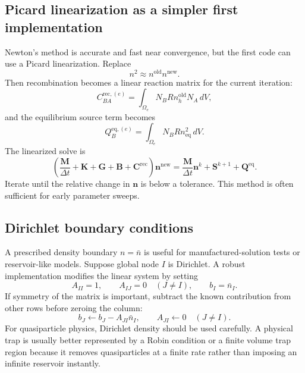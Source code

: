 \documentclass[11pt]{article}
\newcommand{\rec}{\mathrm{rec}}
\newcommand{\eq}{\mathrm{eq}}
\begin{document}
\subsection{Picard linearization as a simpler first implementation}
Newton's method is accurate and fast near convergence, but the first code can use a Picard linearization. Replace
\begin{equation}
n^2\approx n^{\mathrm{old}}n^{\mathrm{new}}.
\end{equation}
Then recombination becomes a linear reaction matrix for the current iteration:
\begin{equation}
C_{BA}^{\rec,(e)}=\int_{\Omega_e}N_B R n_h^{\mathrm{old}}N_A\,dV,
\end{equation}
and the equilibrium source term becomes
\begin{equation}
Q_B^{\eq,(e)}=\int_{\Omega_e}N_B R n_{\eq}^2\,dV.
\end{equation}
The linearized solve is
\begin{equation}
\left(\frac{\bm{M}}{\Delta t}+\bm{K}+\bm{G}+\bm{B}+\bm{C}^{\rec}\right)\bm{n}^{\mathrm{new}}
=\frac{\bm{M}}{\Delta t}\bm{n}^{k}+\bm{S}^{k+1}+\bm{Q}^{\eq}.
\end{equation}
Iterate until the relative change in $\bm{n}$ is below a tolerance. This method is often sufficient for early parameter sweeps.

\subsection{Dirichlet boundary conditions}
A prescribed density boundary $n=\bar n$ is useful for manufactured-solution tests or reservoir-like models. Suppose global node $I$ is Dirichlet. A robust implementation modifies the linear system by setting
\begin{equation}
A_{II}=1,
\qquad A_{IJ}=0\quad(J\ne I),
\qquad b_I=\bar n_I.
\end{equation}
If symmetry of the matrix is important, subtract the known contribution from other rows before zeroing the column:
\begin{equation}
b_J\leftarrow b_J-A_{JI}\bar n_I,
\qquad A_{JI}\leftarrow0 \quad (J\ne I).
\end{equation}
For quasiparticle physics, Dirichlet density should be used carefully. A physical trap is usually better represented by a Robin condition or a finite volume trap region because it removes quasiparticles at a finite rate rather than imposing an infinite reservoir instantly.
\end{document}

